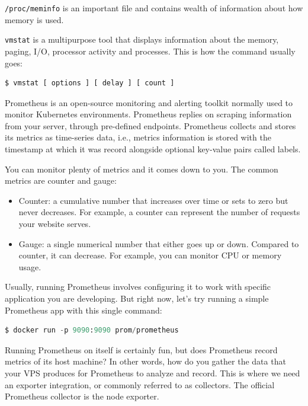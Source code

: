 \documentclass[11pt]{article}
\begin{document}
\noindent \texttt{/proc/meminfo} is an important file and contains wealth of information about how memory is used. 

\noindent \texttt{vmstat} is a multipurpose tool that displays information about the memory, paging, I/O, processor activity and processes. This is how the command usually goes:

\begin{lstlisting}[language=python]
    $ vmstat [ options ] [ delay ] [ count ]
\end{lstlisting}

\noindent Prometheus is an open-source monitoring and alerting toolkit normally used to monitor Kubernetes environments. Prometheus replies on scraping information from your server, through pre-defined endpoints. Prometheus collects and stores its metrics as time-series data, i.e., metrics information is stored with the timestamp at which it was record alongside optional key-value pairs called labels.

\noindent You can monitor plenty of metrics and it comes down to you. The common metrics are counter and gauge:
\begin{itemize}
    \item[] Counter: a cumulative number that increases over time or sets to zero but never decreases. For example, a counter can represent the number of requests your website serves.
    \item[] Gauge: a single numerical number that either goes up or down. Compared to counter, it can decrease. For example, you can monitor CPU or memory usage.
\end{itemize}

\noindent Usually, running Prometheus involves configuring it to work with specific application you are developing. But right now, let's try running a simple Prometheus app with this single command:

\begin{lstlisting}[language=python]
$ docker run -p 9090:9090 prom/prometheus
\end{lstlisting}

\noindent Running Prometheus on itself is certainly fun, but does Prometheus record metrics of its host machine? In other words, how do you gather the data that your VPS produces for Prometheus to analyze and record. This is where we need an exporter integration, or commonly referred to as collectors. The official Prometheus collector is the node exporter. 
\end{document}
